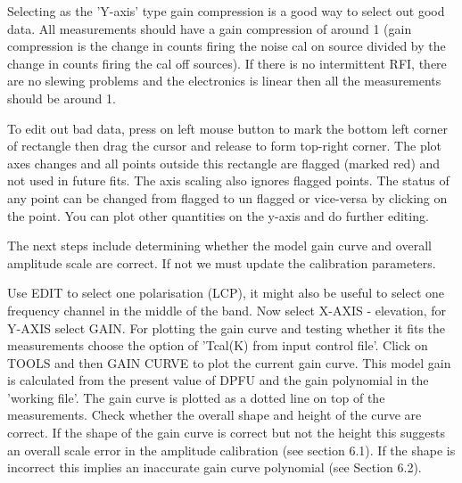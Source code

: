     Selecting as the 'Y-axis' type  gain compression is a 
    good way to select out good data.  All measurements should have a 
    gain compression of around 
    1  (gain compression is the change in counts firing the noise
    cal on source divided by the change in counts firing the cal off
    sources). If there is no intermittent RFI, there are no 
    slewing problems and the electronics is linear then all the 
   measurements should be around 1.
 
  To edit out bad data, press on left mouse button to mark the bottom left 
  corner of rectangle    then drag the cursor and release to form top-right 
  corner. The plot axes changes and  all points outside this rectangle are 
  flagged (marked red) and not used in future fits. The axis scaling also 
  ignores flagged points. The status of any point can be changed from flagged
  to un flagged or vice-versa by clicking on the point. You can plot other 
  quantities on the y-axis and do further editing.


\vskip 1cm


\vskip 0.5cm


\vskip 0.5cm

   The next steps include determining whether the model gain curve
   and overall amplitude scale are correct. If not we must update 
   the calibration parameters.  

   Use EDIT to select one polarisation (LCP), it might 
   also be useful to select one frequency channel in the 
   middle of the band. Now  select X-AXIS - elevation, for Y-AXIS 
   select  GAIN. For plotting the gain curve and testing whether it 
   fits the measurements choose the option of 'Tcal(K) 
   from input control file'. Click on TOOLS and then GAIN CURVE to 
   plot  the current gain curve. This model gain is calculated  from 
   the present value of DPFU and the gain polynomial in  the 'working file'. 
   The gain curve is plotted as a dotted line on top of the measurements.
   Check whether the overall shape and height of the  curve are correct.
   If the shape of the gain curve is correct but not the height
   this suggests an overall scale error in  the amplitude  calibration (see
   section 6.1). If the shape is incorrect this implies an inaccurate gain curve
   polynomial (see Section 6.2).

\vskip 0.5cm

